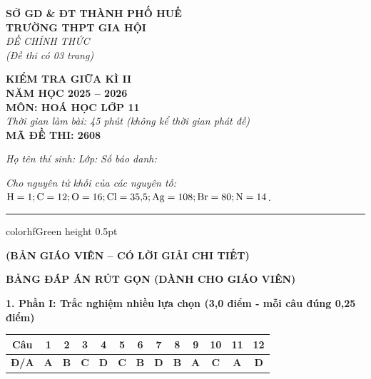\documentclass[11pt,a4paper]{article}
\begin{document}
\begin{minipage}[t]{0.48\textwidth}
\textbf{SỞ GD \& ĐT THÀNH PHỐ HUẾ}\\
\textbf{TRƯỜNG THPT GIA HỘI}\\
\textit{ĐỀ CHÍNH THỨC}\\
\textit{(Đề thi có 03 trang)}
\end{minipage}
\hfill
\begin{minipage}[t]{0.48\textwidth}
\raggedleft
\textbf{\color{hfRed}KIỂM TRA GIỮA KÌ II}\\
\textbf{NĂM HỌC 2025 -- 2026}\\
\textbf{MÔN: HOÁ HỌC LỚP 11}\\
\textit{Thời gian làm bài: 45 phút (không kể thời gian phát đề)}\\
\textbf{MÃ ĐỀ THI: 2608}
\end{minipage}

\vspace{4pt}
\noindent
\textit{Họ tên thí sinh:} \dotfill \textit{Lớp:} \dotfill \textit{Số báo danh:} \dotfill

\vspace{3pt}
\noindent
\textit{\footnotesize Cho nguyên tử khối của các nguyên tố: $\ce{H}=1; \ce{C}=12; \ce{O}=16; \ce{Cl}=35{,}5; \ce{Ag}=108; \ce{Br}=80; \ce{N}=14$.}

\vspace{3pt}
\hrule color{hfGreen} height 0.5pt

\vspace{4pt}
\begin{center}
\textbf{\color{hfRed}\large (BẢN GIÁO VIÊN -- CÓ LỜI GIẢI CHI TIẾT)}
\end{center}

\vspace{2pt}
\begin{center}
{\color{hfRed}\textbf{\large BẢNG ĐÁP ÁN RÚT GỌN (DÀNH CHO GIÁO VIÊN)}}
\end{center}

\vspace{2pt}
\noindent
\textbf{\color{mainGreen}1. Phần I: Trắc nghiệm nhiều lựa chọn (3,0 điểm - mỗi câu đúng 0,25 điểm)}
\begin{center}
\renewcommand{\arraystretch}{1.2}
\begin{tabular}{|c|c|c|c|c|c|c|c|c|c|c|c|c|}
\hline
\rowcolor{tableGreen}
\textbf{Câu} & \textbf{1} & \textbf{2} & \textbf{3} & \textbf{4} & \textbf{5} & \textbf{6} & \textbf{7} & \textbf{8} & \textbf{9} & \textbf{10} & \textbf{11} & \textbf{12} \\
\hline
\textbf{Đ/A} & \textbf{\color{hfRed}A} & \textbf{\color{hfRed}B} & \textbf{\color{hfRed}C} & \textbf{\color{hfRed}D} & \textbf{\color{hfRed}C} & \textbf{\color{hfRed}B} & \textbf{\color{hfRed}D} & \textbf{\color{hfRed}B} & \textbf{\color{hfRed}A} & \textbf{\color{hfRed}C} & \textbf{\color{hfRed}A} & \textbf{\color{hfRed}D} \\
\hline
\end{tabular}
\end{center}
\end{document}
